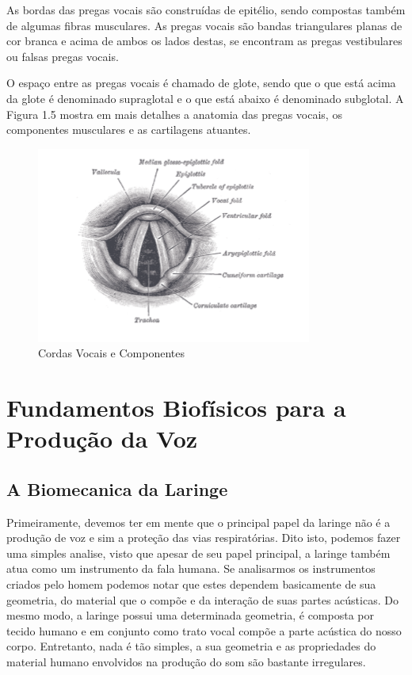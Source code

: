 As bordas das pregas vocais são construídas de epitélio, sendo compostas também de algumas ﬁbras musculares. As pregas vocais são bandas triangulares planas de cor branca e acima de ambos os lados destas, se encontram as pregas vestibulares ou falsas pregas vocais. 

O espaço entre as pregas vocais é chamado de glote, sendo que o que está acima da glote é denominado supraglotal e o que está abaixo é denominado subglotal. A Figura 1.5 mostra em mais detalhes a anatomia das pregas vocais, os componentes musculares e as cartilagens atuantes.

\begin{figure}
	\centering
	\includegraphics[scale=0.5]{cordasVocais}
	\caption{ Cordas Vocais e Componentes}
	\label{fig:cordasVocasi}
\end{figure}

\section{Fundamentos Biofísicos para a Produção da Voz}
	\subsection{ A Biomecanica da Laringe}
	Primeiramente, devemos ter em mente que o principal papel da laringe não é a produção de voz e sim a proteção das vias respiratórias. Dito isto, podemos fazer uma simples analise, visto que apesar de seu papel principal, a laringe também atua como um instrumento da fala humana. Se analisarmos os instrumentos criados pelo homem podemos notar que estes dependem basicamente de sua geometria, do material que o compõe e da interação de suas partes acústicas. Do mesmo modo, a laringe possui uma determinada geometria, é composta por tecido humano e em conjunto como trato vocal compõe a parte acústica do nosso corpo. Entretanto, nada é tão simples, a sua geometria e as propriedades do material humano envolvidos na produção do som são bastante irregulares\cite{IngoTitze}. 
	
